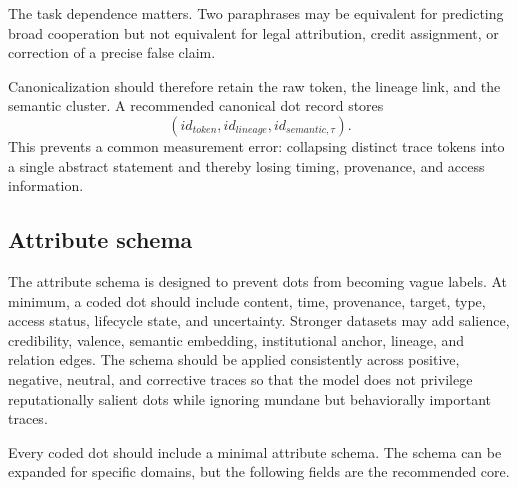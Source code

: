 \documentclass[11pt]{article}
\theoremstyle{remark}
\begin{document}
The task dependence matters. Two paraphrases may be equivalent for
predicting broad cooperation but not equivalent for legal attribution,
credit assignment, or correction of a precise false claim.

Canonicalization should therefore retain the raw token, the lineage link,
and the semantic cluster. A recommended canonical dot record stores
\[
(id_{token},id_{lineage},id_{semantic,\tau}).
\]
This prevents a common measurement error: collapsing distinct trace tokens
into a single abstract statement and thereby losing timing, provenance,
and access information.

\subsection{Attribute schema}\label{attribute-schema}

The attribute schema is designed to prevent dots from becoming vague labels. At minimum, a coded dot should include content, time, provenance, target, type, access status, lifecycle state, and uncertainty. Stronger datasets may add salience, credibility, valence, semantic embedding, institutional anchor, lineage, and relation edges. The schema should be applied consistently across positive, negative, neutral, and corrective traces so that the model does not privilege reputationally salient dots while ignoring mundane but behaviorally important traces.


Every coded dot should include a minimal attribute schema. The schema can
be expanded for specific domains, but the following fields are the
recommended core.
\end{document}
